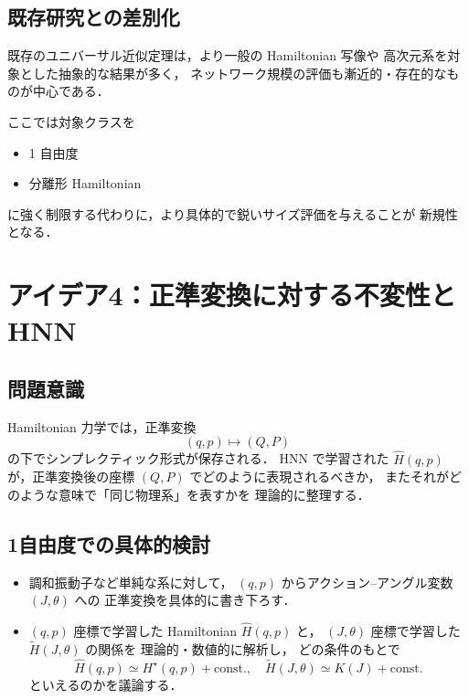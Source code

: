 \documentclass[a4paper,12pt]{jlreq}
\begin{document}
\subsection*{既存研究との差別化}

既存のユニバーサル近似定理は，より一般の Hamiltonian 写像や
高次元系を対象とした抽象的な結果が多く，
ネットワーク規模の評価も漸近的・存在的なものが中心である．

ここでは対象クラスを
\begin{itemize}
  \item 1 自由度
  \item 分離形 Hamiltonian
\end{itemize}
に強く制限する代わりに，より具体的で鋭いサイズ評価を与えることが
新規性となる．

\bigskip

\section*{アイデア4：正準変換に対する不変性と HNN}

\subsection*{問題意識}

Hamiltonian 力学では，正準変換
\[
  (q,p) \mapsto (Q,P)
\]
の下でシンプレクティック形式が保存される．
HNN で学習された \(\hat{H}(q,p)\) が，正準変換後の座標
\((Q,P)\) でどのように表現されるべきか，
またそれがどのような意味で「同じ物理系」を表すかを
理論的に整理する．

\subsection*{1自由度での具体的検討}

\begin{itemize}
  \item 調和振動子など単純な系に対して，
        \((q,p)\) からアクション--アングル変数 \((J,\theta)\) への
        正準変換を具体的に書き下ろす．
  \item \((q,p)\) 座標で学習した Hamiltonian \(\hat{H}(q,p)\) と，
        \((J,\theta)\) 座標で学習した \(\tilde{H}(J,\theta)\) の関係を
        理論的・数値的に解析し，
        どの条件のもとで
        \[
          \hat{H}(q,p) \simeq H^\star(q,p) + \text{const.},\quad
          \tilde{H}(J,\theta) \simeq K(J) + \text{const.}
        \]
        といえるのかを議論する．
\end{itemize}
\end{document}
